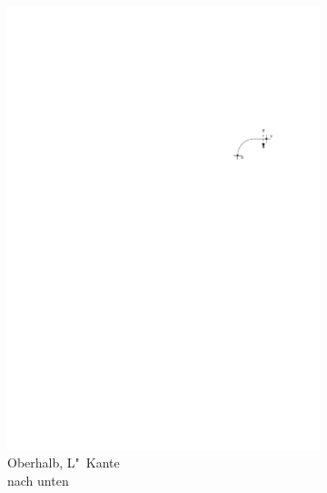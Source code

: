 \documentclass[a4paper]{scrreprt}
\theoremstyle{definition}
\begin{document}
\begin{figure}[h]
\begin{subfigure}[b]{0.2\textwidth}
                \includegraphics[width=\textwidth]{schnitt_finden_top_downwardsL}
                \caption{Oberhalb, L"~Kante \\ nach unten}
                \label{fig:cutfinding_top_downwardsL}
        \end{subfigure}
        \quad
        \begin{subfigure}[b]{0.2\textwidth}

\end{subfigure}
\end{figure}
\end{document}
